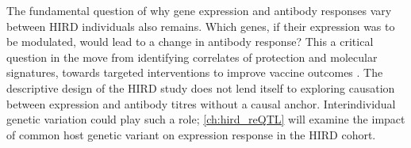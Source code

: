 The fundamental question of why gene expression and antibody responses vary between \gls{HIRD} individuals also remains.
Which genes, if their expression was to be modulated, would lead to a change in antibody response?
This a critical question in the move from identifying correlates of protection and molecular signatures, towards targeted interventions to improve vaccine outcomes \autocite{tsang2020ImprovingVaccineinducedImmunity}.
The descriptive design of the \gls{HIRD} study does not lend itself to exploring causation between expression and antibody titres without a causal anchor.
Interindividual genetic variation could play such a role; \cref{ch:hird_reQTL} will examine the impact of common host genetic variant on expression response in the \gls{HIRD} cohort.

%

%
%

